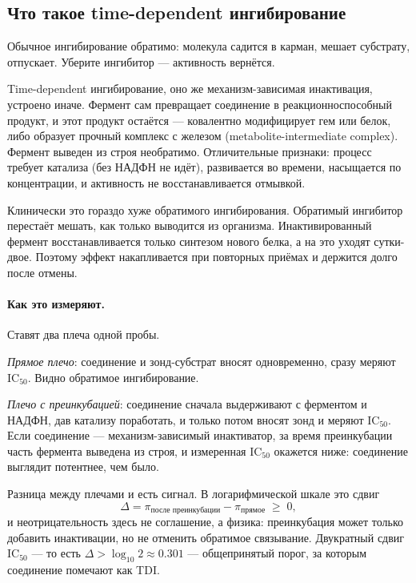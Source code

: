 \subsection{Что такое time-dependent ингибирование}
\label{sec:tdi}

Обычное ингибирование обратимо: молекула садится в карман, мешает субстрату, отпускает. Уберите
ингибитор --- активность вернётся.

Time-dependent ингибирование, оно же механизм-зависимая инактивация, устроено иначе. Фермент сам
превращает соединение в реакционноспособный продукт, и этот продукт остаётся --- ковалентно
модифицирует гем или белок, либо образует прочный комплекс с железом (metabolite-intermediate complex).
Фермент выведен из строя необратимо. Отличительные признаки: процесс требует катализа (без НАДФН
не идёт), развивается во времени, насыщается по концентрации, и активность не восстанавливается
отмывкой.

Клинически это гораздо хуже обратимого ингибирования. Обратимый ингибитор перестаёт мешать, как только
выводится из организма. Инактивированный фермент восстанавливается только синтезом нового белка,
а на это уходят сутки-двое. Поэтому эффект накапливается при повторных приёмах и держится долго после
отмены.

\paragraph{Как это измеряют.} Ставят два плеча одной пробы.

\emph{Прямое плечо}: соединение и зонд-субстрат вносят одновременно, сразу меряют IC$_{50}$. Видно
обратимое ингибирование.

\emph{Плечо с преинкубацией}: соединение сначала выдерживают с ферментом и НАДФН, дав катализу
поработать, и только потом вносят зонд и меряют IC$_{50}$. Если соединение --- механизм-зависимый
инактиватор, за время преинкубации часть фермента выведена из строя, и измеренная IC$_{50}$ окажется
ниже: соединение выглядит потентнее, чем было.

Разница между плечами и есть сигнал. В логарифмической шкале это сдвиг
\[
\Delta = \pi_{\text{после преинкубации}} - \pi_{\text{прямое}} \;\ge\; 0 ,
\]
и неотрицательность здесь не соглашение, а физика: преинкубация может только добавить инактивации,
но не отменить обратимое связывание. Двукратный сдвиг IC$_{50}$ --- то есть $\Delta > \log_{10}2 \approx 0.301$
--- общепринятый порог, за которым соединение помечают как TDI.

